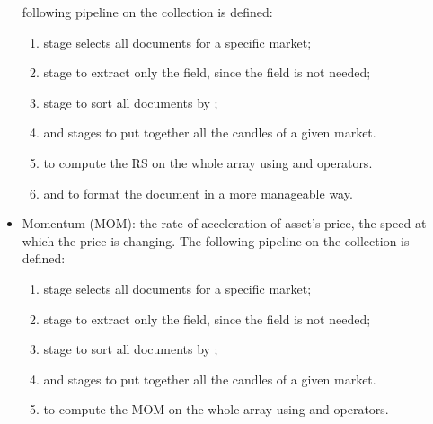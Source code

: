 \begin{itemize}
		following pipeline on the  collection is
		defined:
		\begin{enumerate}
			\item {} stage selects all documents for a
				specific market;
			\item {} stage to extract only the
				 field, since the  field
				is not needed;
			\item {} stage to sort all documents by
				;
			\item {} and  stages to
				put together all the candles of a given market.
			\item {} to compute the RS on the whole
				array using  and 
				operators.
			\item {} and  to format
				the document in a more manageable way.
		\end{enumerate}
	\item Momentum (MOM): the rate of acceleration of asset's price, the
		speed at which the price is changing. The following pipeline on
		the  collection is defined:
		\begin{enumerate}
			\item {} stage selects all documents for a
				specific market;
			\item {} stage to extract only the
				 field, since the  field
				is not needed;
			\item {} stage to sort all documents by
				;
			\item {} and  stages to
				put together all the candles of a given market.
			\item {} to compute the MOM on the whole
				array using  and 
				operators.
		\end{enumerate}
\end{itemize}
